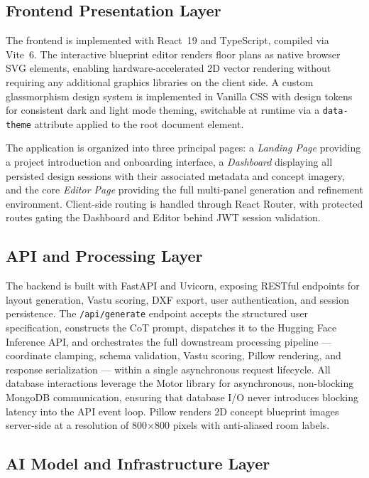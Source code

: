\documentclass[10pt, twocolumn, letterpaper]{article}
\begin{document}
\subsection{Frontend Presentation Layer}

The frontend is implemented with React~19 and TypeScript, compiled via
Vite~6. The interactive blueprint editor renders floor plans as native browser
SVG elements, enabling hardware-accelerated 2D vector rendering without
requiring any additional graphics libraries on the client side. A custom
glassmorphism design system is implemented in Vanilla CSS with design tokens
for consistent dark and light mode theming, switchable at runtime via a
\texttt{data-theme} attribute applied to the root document element.

The application is organized into three principal pages: a \textit{Landing
Page} providing a project introduction and onboarding interface, a
\textit{Dashboard} displaying all persisted design sessions with their
associated metadata and concept imagery, and the core \textit{Editor Page}
providing the full multi-panel generation and refinement environment.
Client-side routing is handled through React Router, with protected routes
gating the Dashboard and Editor behind JWT session validation.

\subsection{API and Processing Layer}

The backend is built with FastAPI and Uvicorn, exposing RESTful endpoints for
layout generation, Vastu scoring, DXF export, user authentication, and
session persistence. The \texttt{/api/generate} endpoint accepts the structured
user specification, constructs the CoT prompt, dispatches it to the Hugging
Face Inference API, and orchestrates the full downstream processing pipeline
--- coordinate clamping, schema validation, Vastu scoring, Pillow rendering,
and response serialization --- within a single asynchronous request lifecycle.
All database interactions leverage the Motor library for asynchronous,
non-blocking MongoDB communication, ensuring that database I/O never introduces
blocking latency into the API event loop. Pillow renders 2D concept blueprint
images server-side at a resolution of 800$\times$800 pixels with
anti-aliased room labels.

\subsection{AI Model and Infrastructure Layer}
\end{document}
